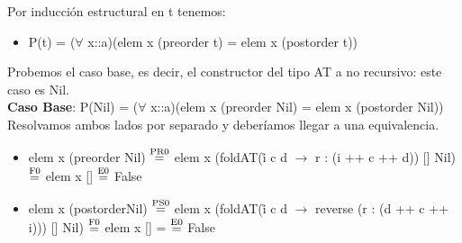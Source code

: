 \documentclass{article}
\begin{document}
Por inducción estructural en t tenemos: 
\begin{itemize}
    \item P(t) = ($\forall$ x::a)(elem x (preorder t) = elem x (postorder t))
\end{itemize}

Probemos el caso base, es decir, el constructor del tipo AT a no recursivo: este caso es Nil. \\ 
\textbf{Caso Base}: P(Nil) = ($\forall$ x::a)(elem x (preorder Nil) = elem x (postorder Nil)) \\ 
Resolvamos ambos lados por separado y deberíamos llegar a una equivalencia. 

\begin{itemize}
    \item elem x (preorder Nil) $\stackrel{\text{PR0}}{=}$ elem x (foldAT(\r i c d $\rightarrow$ r : (i ++ c ++ d)) [] Nil) $\stackrel{\text{F0}}{=}$ elem x [] $\stackrel{\text{E0}}{=}$ False
    
    \item elem x (postorderNil) $\stackrel{\text{PS0}}{=}$ elem x (foldAT(\r i c d $\rightarrow$ reverse (r : (d ++ c ++ i))) [] Nil) $\stackrel{\text{F0}}{=}$ elem x [] = $\stackrel{\text{E0}}{=}$ False
\end{itemize}
\end{document}
